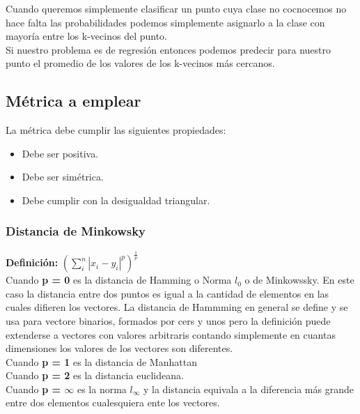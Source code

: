\documentclass[titlepage,a4paper]{article}
\begin{document}
Cuando queremos simplemente clasificar un punto cuya clase no cocnocemos no hace falta las probabilidades podemos simplemente asignarlo a la clase con mayoría entre los k-vecinos del punto. \\

Si nuestro problema es de regresión entonces podemos predecir para nuestro punto el promedio de los valores de los k-vecinos más cercanos. \\

\subsection*{Métrica a emplear}
La métrica debe cumplir las siguientes propiedades:
\begin{itemize}
\item Debe ser positiva.
\item Debe ser simétrica.
\item Debe cumplir con la desigualdad triangular.
\end{itemize}

\subsubsection*{Distancia de Minkowsky}
\textbf{Definición:} $\left(\displaystyle\sum_i^n |x_i-y_i|^p\right)^{\frac{1}{p}}$\\

Cuando \textbf{p = 0} es la distancia de Hamming o Norma $l_0$ o de Minkowssky. En este caso la distancia entre dos puntos es igual a la cantidad de elementos en las cuales difieren los vectores. La distancia de Hammming en general se define y se usa para vectore binarios, formados por cers y unos pero la definición puede extenderse a vectores con valores arbitraris contando simplemente en cuantas dimensiones los valores de los vectores son diferentes. \\

Cuando \textbf{p = 1} es la distancia de Manhattan\\

Cuando\textbf{ p = 2} es la distancia euclideana. \\

Cuando \textbf{p = $\infty$} es la norma $ l_{\infty}$ y la distancia equivala a la diferencia más grande entre dos elementos cualesquiera ente  los vectores. 
\end{document}
